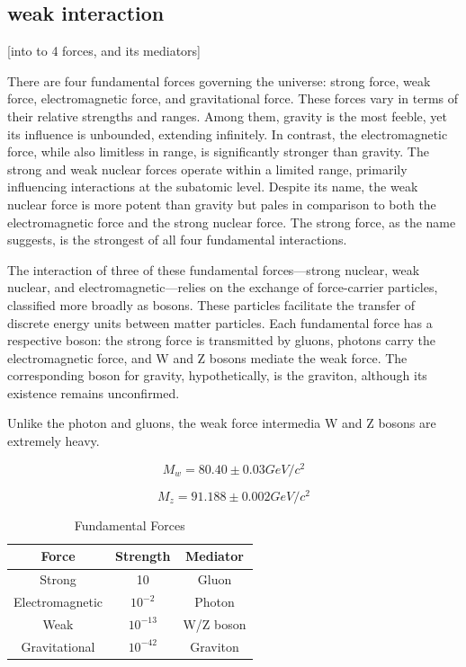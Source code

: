 \subsection{weak interaction}
[into to 4 forces, and its mediators]

There are four fundamental forces governing the universe: strong force, weak force, electromagnetic force, and gravitational force. These forces vary in terms of their relative strengths and ranges. Among them, gravity is the most feeble, yet its influence is unbounded, extending infinitely. In contrast, the electromagnetic force, while also limitless in range, is significantly stronger than gravity. The strong and weak nuclear forces operate within a limited range, primarily influencing interactions at the subatomic level. Despite its name, the weak nuclear force is more potent than gravity but pales in comparison to both the electromagnetic force and the strong nuclear force. The strong force, as the name suggests, is the strongest of all four fundamental interactions.

The interaction of three of these fundamental forces—strong nuclear, weak nuclear, and electromagnetic—relies on the exchange of force-carrier particles, classified more broadly as bosons. These particles facilitate the transfer of discrete energy units between matter particles. Each fundamental force has a respective boson: the strong force is transmitted by gluons, photons carry the electromagnetic force, and W and Z bosons mediate the weak force. The corresponding boson for gravity, hypothetically, is the graviton, although its existence remains unconfirmed.

Unlike the photon and gluons, the weak force intermedia W and Z bosons are extremely heavy. 

\begin{equation}
    M_w = 80.40 \pm 0.03 GeV/c^2
\end{equation}

\begin{equation}
    M_z = 91.188 \pm 0.002 GeV/c^2
\end{equation}

\begin{table}[!h]
    \centering
    \begin{tabular}{c |c | c}
         Force  & Strength & Mediator \\ \hline
         Strong & 10  & Gluon \\ \hline
         Electromagnetic & $10^{-2}$ &  Photon \\ \hline
         Weak & $10^{-13}$ & W/Z boson \\ \hline
         Gravitational & $10^{-42}$ & Graviton \\ \hline
    \end{tabular}
    \caption{Fundamental Forces}
    \label{tab:my_label}
\end{table}


